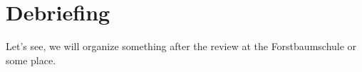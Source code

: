 \documentclass[11pt]{article}
\begin{document}



%

%


\section*{Debriefing}

Let's see, we will organize something after the review at the
Forstbaumschule  or some place.









%
%
\end{document}
